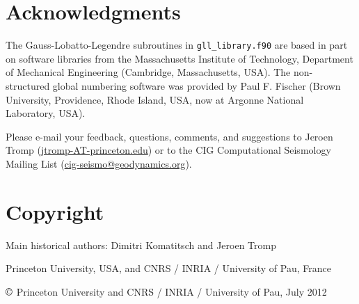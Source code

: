 \documentclass[oneside,english,onecolumn,letterpaper]{book}
\newcommand{\urlwithparentheses}[1]{(\url{#1})}
\begin{document}

\chapter*{Acknowledgments}


The Gauss-Lobatto-Legendre subroutines in \texttt{gll\_library.f90}
are based in part on software libraries from the Massachusetts Institute
of Technology, Department of Mechanical Engineering (Cambridge, Massachusetts, USA).
The non-structured global numbering software was provided by Paul
F. Fischer (Brown University, Providence, Rhode Island, USA, now at Argonne National Laboratory, USA).


Please e-mail your feedback, questions, comments, and suggestions
to Jeroen Tromp \urlwithparentheses{jtromp-AT-princeton.edu} or to the CIG Computational Seismology Mailing List \urlwithparentheses{cig-seismo@geodynamics.org}.



\chapter*{Copyright}


Main historical authors: Dimitri Komatitsch and Jeroen Tromp

Princeton University, USA,
and CNRS / INRIA / University of Pau, France

$\copyright$ Princeton University and CNRS / INRIA / University of Pau, July 2012







\appendix


\end{document}
